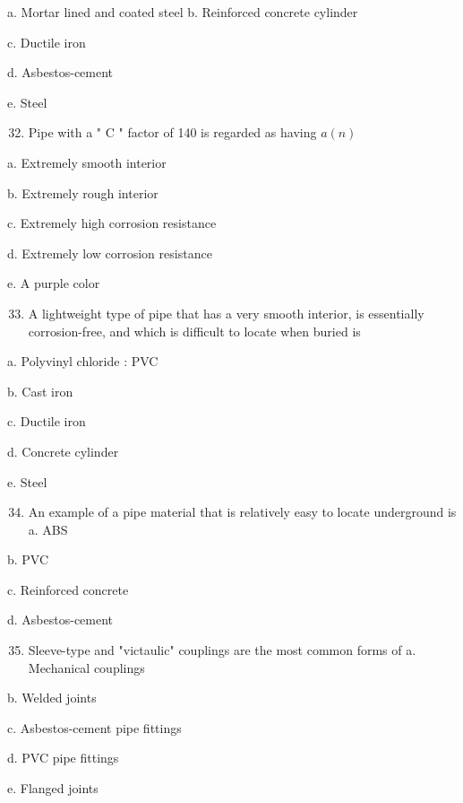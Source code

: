 \documentclass[10pt]{article}
\begin{document}
\begin{enumerate}
\begin{enumerate}
a. Mortar lined and coated steel b. Reinforced concrete cylinder

c. Ductile iron

d. Asbestos-cement

e. Steel

\begin{enumerate}
  \setcounter{enumi}{31}
  \item Pipe with a " $\mathrm{C}$ " factor of 140 is regarded as having $a(n)$
\end{enumerate}

a. Extremely smooth interior

b. Extremely rough interior

c. Extremely high corrosion resistance

d. Extremely low corrosion resistance

e. A purple color

\begin{enumerate}
  \setcounter{enumi}{32}
  \item A lightweight type of pipe that has a very smooth interior, is essentially corrosion-free, and which is difficult to locate when buried is
\end{enumerate}

a. Polyvinyl chloride : PVC

b. Cast iron

c. Ductile iron

d. Concrete cylinder

e. Steel

\begin{enumerate}
  \setcounter{enumi}{33}
  \item An example of a pipe material that is relatively easy to locate underground is a. ABS
\end{enumerate}

b. PVC

c. Reinforced concrete

d. Asbestos-cement

\begin{enumerate}
  \setcounter{enumi}{34}
  \item Sleeve-type and "victaulic" couplings are the most common forms of a. Mechanical couplings
\end{enumerate}

b. Welded joints

c. Asbestos-cement pipe fittings

d. PVC pipe fittings

e. Flanged joints


\end{enumerate}
\end{enumerate}
\end{document}
